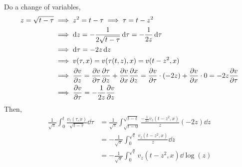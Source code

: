 \documentclass{article}
\begin{document}
Do a change of variables,
\begin{align*}
  z = \sqrt{t-\tau}&\implies z^2 = t - \tau \implies \tau = t-z^2\\
                   &\implies \dd{z} =
                     -\frac{1}{2\sqrt{t-\tau}}\dd{\tau} =
                     -\frac{1}{2z}\dd{\tau}\\
  &\implies \dd{\tau} = -2z\dd{z}\\
                   &\implies v(\tau,x) =
                     v(\tau(t,z),x) = v(t-z^2,x)\\
                   &\implies \pdv{v}{z} = \pdv{v}{\tau}\pdv{\tau}{z}+
                     \pdv{v}{x}\pdv{x}{z} = \pdv{v}{\tau}\cdot (-2z) +
                     \pdv{v}{x}\cdot{0} = -2z\pdv{v}{\tau}\\
                   &\implies \pdv{v}{\tau} = -\frac{1}{2z}\pdv{v}{z}
\end{align*}
Then,
\begin{align*}\frac{1}{\sqrt{\pi}}\int_0^t
  \frac{v_{\tau}({\tau},x)}{\sqrt{t-{\tau}}}\dd{\tau}
 &= \frac{1}{\sqrt{\pi}}\int_{\sqrt{t-0}}^{\sqrt{t-t}}
   \frac{-\frac{1}{2z} v_{z}(t-z^2,x)}{z}(-2z)\dd{z}\\
  &= -\frac{1}{\sqrt{\pi}}\int_{0}^{\sqrt{t}}
    \frac{v_{z}(t-z^2,x)}{z}\dd{z}\\
  &= -\frac{1}{\sqrt{\pi}}\int_{0}^{\sqrt{t}}
    v_{z}(t-z^2,x)\dd{\log (z)}
\end{align*}
\end{document}
